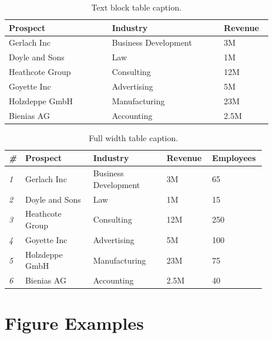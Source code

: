 \documentclass[
	a4paper, %
	12pt, %
]{include/CSSullivanBusinessReport}
\begin{document}
\begin{table}[H] %
	\caption{Text block table caption.}
	\begin{tabular}{L{0.35\linewidth} L{0.38\linewidth} L{0.16\linewidth}}
		\toprule
		\textbf{Prospect} & \textbf{Industry} & \textbf{Revenue} \\
		\midrule
		Gerlach Inc & Business Development & 3M\\
		Doyle and Sons & Law & 1M\\
		Heathcote Group & Consulting & 12M\\
		Goyette Inc & Advertising & 5M\\
		Holzdeppe GmbH & Manufacturing & 23M\\
		Bienias AG & Accounting & 2.5M\\
		\bottomrule
	\end{tabular}
	\label{tab:example}
\end{table}


\begin{table} %
	\caption{Full width table caption.}
	\begin{tabular}{C{0.03\linewidth} L{0.25\linewidth} L{0.27\linewidth} L{0.16\linewidth} L{0.16\linewidth}}
		\toprule
		\textit{\#} & \textbf{Prospect} & \textbf{Industry} & \textbf{Revenue} & \textbf{Employees} \\
		\midrule
		\textit{1} & Gerlach Inc & Business Development & 3M & 65\\
		\textit{2} & Doyle and Sons & Law & 1M & 15\\
		\textit{3} & Heathcote Group & Consulting & 12M & 250\\
		\textit{4} & Goyette Inc & Advertising & 5M & 100\\
		\textit{5} & Holzdeppe GmbH & Manufacturing & 23M & 75\\
		\textit{6} & Bienias AG & Accounting & 2.5M & 40\\
		\bottomrule
	\end{tabular}
\end{table}


\section{Figure Examples}
\end{document}
